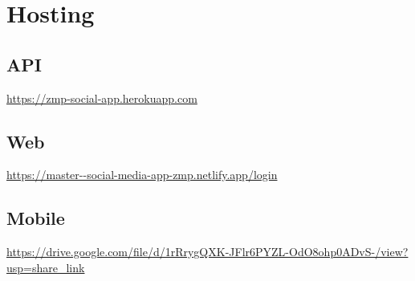\documentclass{article}
\begin{document}
\section{Hosting}

\subsection{API}
\url{https://zmp-social-app.herokuapp.com}

\subsection{Web}
\url{https://master--social-media-app-zmp.netlify.app/login}
\subsection{Mobile}
\url{https://drive.google.com/file/d/1rRrygQXK-JFlr6PYZL-OdO8ohp0ADvS-/view?usp=share_link}
\end{document}
